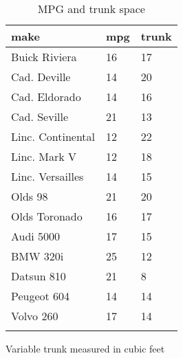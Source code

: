 \documentclass{article}
\begin{document}
\begin{table}[tbp] \centering
{}

\caption{MPG and trunk space}
\begin{tabularx}{\textwidth}{lCC}

\toprule
{make}&{mpg}&{trunk} \tabularnewline
\midrule\addlinespace[1.5ex]
Buick Riviera&16&17 \tabularnewline
Cad. Deville&14&20 \tabularnewline
Cad. Eldorado&14&16 \tabularnewline
Cad. Seville&21&13 \tabularnewline
Linc. Continental&12&22 \tabularnewline
Linc. Mark V&12&18 \tabularnewline
Linc. Versailles&14&15 \tabularnewline
Olds 98&21&20 \tabularnewline
Olds Toronado&16&17 \tabularnewline
Audi 5000&17&15 \tabularnewline
BMW 320i&25&12 \tabularnewline
Datsun 810&21&8 \tabularnewline
Peugeot 604&14&14 \tabularnewline
Volvo 260&17&14 \tabularnewline
\bottomrule \addlinespace[1.5ex]

\end{tabularx}
\begin{flushleft}
\footnotesize Variable trunk measured in cubic feet
\end{flushleft}
\end{table}
\end{document}
